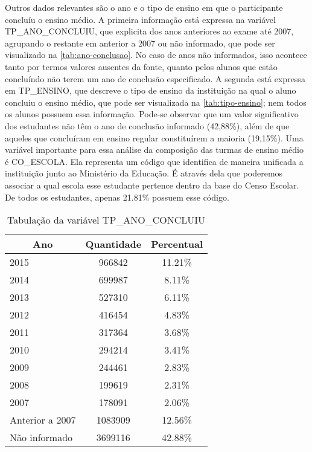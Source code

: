   Outros dados relevantes são o ano e o tipo de ensino em que o participante concluíu o ensino médio. A primeira informação está expressa na variável TP\_ANO\_CONCLUIU, que explicita dos anos anteriores ao exame até 2007, agrupando o restante em anterior a 2007 ou não informado, que pode ser visualizado na \autoref{tab:ano-conclusao}. No caso de anos não informados, isso acontece tanto por termos valores ausentes da fonte, quanto pelos alunos que estão concluíndo não terem um ano de conclusão especificado. A segunda está expressa em TP\_ENSINO, que descreve o tipo de ensino da instituição na qual o aluno concluiu o ensino médio, que pode ser visualizada na \autoref{tab:tipo-ensino}; nem todos os alunos possuem essa informação. Pode-se observar que um valor significativo dos estudantes não têm o ano de conclusão informado (42,88\%), além de que aqueles que concluíram em ensino regular constituírem a maioria (19,15\%). Uma variável importante para essa análise da composição das turmas de ensino médio é CO\_ESCOLA. Ela representa um código que identifica de maneira unificada a instituição junto ao Ministério da Educação. É através dela que poderemos associar a qual escola esse estudante pertence dentro da base do Censo Escolar. De todos os estudantes, apenas 21.81\% possuem esse código.

  \begin{table}[h]
    \begin{tabular}{lcc}
    \hline
    \multicolumn{1}{c}{\textbf{Ano}} & \textbf{Quantidade} & \textbf{Percentual} \\ \hline
    2015                             & 966842              & 11.21\%             \\ \hline
    2014                             & 699987              & 8.11\%              \\ \hline
    2013                             & 527310              & 6.11\%              \\ \hline
    2012                             & 416454              & 4.83\%              \\ \hline
    2011                             & 317364              & 3.68\%              \\ \hline
    2010                             & 294214              & 3.41\%              \\ \hline
    2009                             & 244461              & 2.83\%              \\ \hline
    2008                             & 199619              & 2.31\%              \\ \hline
    2007                             & 178091              & 2.06\%              \\ \hline
    Anterior a 2007                  & 1083909             & 12.56\%             \\ \hline
    Não informado                    & 3699116             & 42.88\%             \\ \hline
    \end{tabular}
    \caption{Tabulação da variável TP\_ANO\_CONCLUIU}
    \label{tab:ano-conclusao}
    \end{table}

